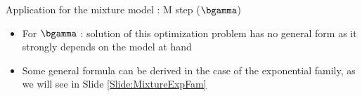 \documentclass[compress,10pt]{beamer}
\begin{document}
\begin{frame}{Application for the mixture model : M step ($\bgamma$)}
 \begin{itemize}
 \item For $\bgamma$ : solution of this optimization problem has no general form as it strongly depends on the model at hand
\item Some general formula can be derived in the case of the  exponential family, as we will see in Slide   \ref{Slide:MixtureExpFam}
 \end{itemize}

\end{frame}



% 
% 
% 
% 
% 
\end{document}
